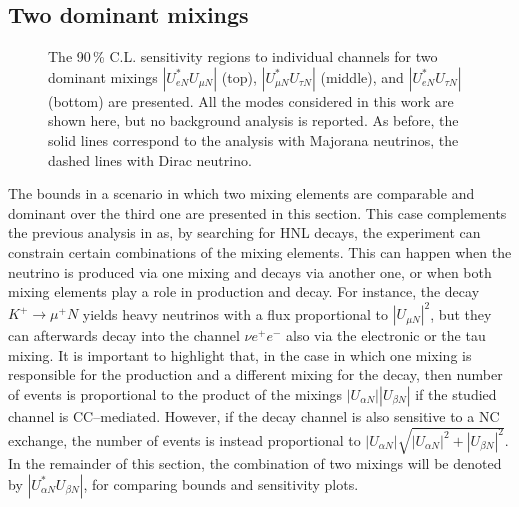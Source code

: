 \subsection{Two dominant mixings}
\label{sec:bimax}

\begin{figure}
	\centering
	{\resizebox{\linewidth}{!}{}}
	\vspace{0.05em}

	{\resizebox{\linewidth}{!}{}}
	\vspace{0.05em}

	{\resizebox{\linewidth}{!}{}}
	\caption{The 90\,\% C.L. sensitivity regions to individual channels for two dominant mixings %
		$|U_{e N}^* U_{\mu N}|$ (top), $|U_{\mu N}^* U_{\tau N}|$ (middle), and $|U_{e N}^* U_{\tau N}|$ (bottom) are presented.
		All the modes considered in this work are shown here, but no background analysis is reported.
		As before, the solid lines correspond to the analysis with Majorana neutrinos, the dashed lines with Dirac neutrino.}
	\label{fig:senseMix}
\end{figure}

The bounds in a scenario in which two mixing elements are comparable and dominant over the third one are presented in this section.
This case complements the previous analysis in  as, by searching for HNL decays, %
the experiment can constrain certain combinations of the mixing elements.
This can happen when the neutrino is produced via one mixing and decays via another one, %
or when both mixing elements play a role in production and decay.
For instance, the decay $K^+ \to \mu^+ N$ yields heavy neutrinos with a flux proportional to %
$|U_{\mu N}|^2$, but they can afterwards decay into the channel $\nu e^+ e^-$ also via the electronic or the tau mixing.
It is important to highlight that, in the case in which one mixing is responsible %
for the production and a different mixing for the decay, %
then number of events is proportional to the product of the mixings %
$|U_{\alpha N}||U_{\beta N}|$ if the studied channel is CC--mediated.
However, if the decay channel is also sensitive to a NC exchange, the number of events is instead proportional to %
$|U_{\alpha N}|\sqrt{|U_{\alpha N}|^2 + |U_{\beta N}|^2}$.
In the remainder of this section, the combination of two mixings will be denoted by $|U_{\alpha N}^* U_{\beta N}|$, %
for comparing bounds and sensitivity plots.

